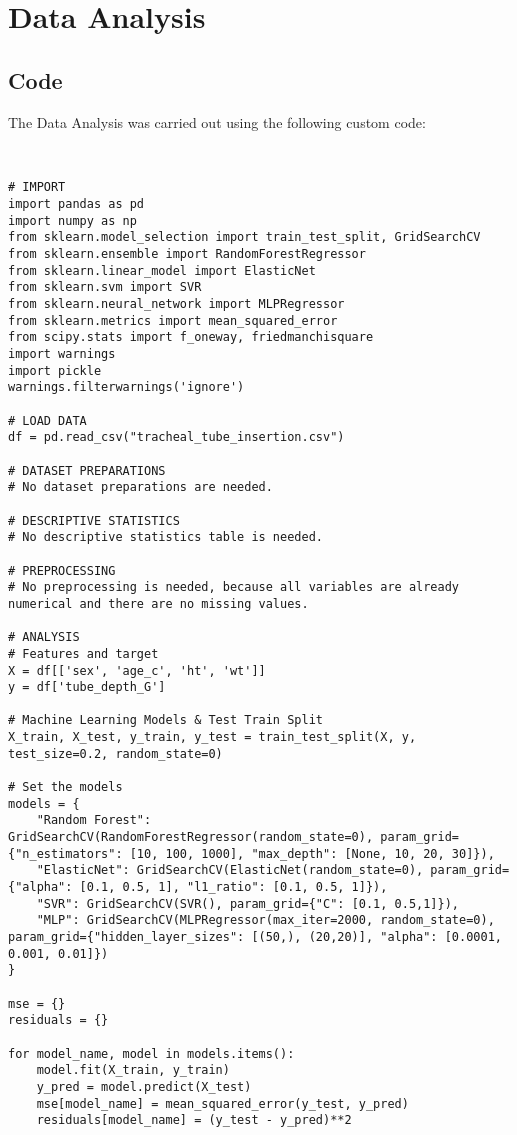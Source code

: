 \documentclass[11pt]{article}
\begin{document}
\section{Data Analysis}
\subsection{{Code}}
The Data Analysis was carried out using the following custom code:

\begin{verbatim}


# IMPORT
import pandas as pd
import numpy as np
from sklearn.model_selection import train_test_split, GridSearchCV
from sklearn.ensemble import RandomForestRegressor
from sklearn.linear_model import ElasticNet
from sklearn.svm import SVR
from sklearn.neural_network import MLPRegressor
from sklearn.metrics import mean_squared_error
from scipy.stats import f_oneway, friedmanchisquare
import warnings
import pickle
warnings.filterwarnings('ignore')

# LOAD DATA
df = pd.read_csv("tracheal_tube_insertion.csv")

# DATASET PREPARATIONS
# No dataset preparations are needed.

# DESCRIPTIVE STATISTICS
# No descriptive statistics table is needed.

# PREPROCESSING 
# No preprocessing is needed, because all variables are already numerical and there are no missing values.

# ANALYSIS
# Features and target
X = df[['sex', 'age_c', 'ht', 'wt']]
y = df['tube_depth_G']

# Machine Learning Models & Test Train Split
X_train, X_test, y_train, y_test = train_test_split(X, y, test_size=0.2, random_state=0)

# Set the models
models = {
    "Random Forest": GridSearchCV(RandomForestRegressor(random_state=0), param_grid={"n_estimators": [10, 100, 1000], "max_depth": [None, 10, 20, 30]}),
    "ElasticNet": GridSearchCV(ElasticNet(random_state=0), param_grid={"alpha": [0.1, 0.5, 1], "l1_ratio": [0.1, 0.5, 1]}),
    "SVR": GridSearchCV(SVR(), param_grid={"C": [0.1, 0.5,1]}),
    "MLP": GridSearchCV(MLPRegressor(max_iter=2000, random_state=0), param_grid={"hidden_layer_sizes": [(50,), (20,20)], "alpha": [0.0001, 0.001, 0.01]})
}

mse = {}
residuals = {}

for model_name, model in models.items():
    model.fit(X_train, y_train)
    y_pred = model.predict(X_test)
    mse[model_name] = mean_squared_error(y_test, y_pred)
    residuals[model_name] = (y_test - y_pred)**2


\end{verbatim}
\end{document}
